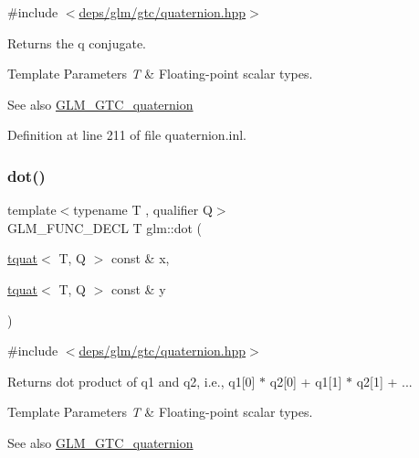 {\ttfamily \#include $<$\hyperlink{gtc_2quaternion_8hpp}{deps/glm/gtc/quaternion.\+hpp}$>$}

Returns the q conjugate.


\begin{DoxyTemplParams}{Template Parameters}
{\em T} & Floating-\/point scalar types.\\
\hline
\end{DoxyTemplParams}
\begin{DoxySeeAlso}{See also}
\hyperlink{group__gtc__quaternion}{G\+L\+M\+\_\+\+G\+T\+C\+\_\+quaternion} 
\end{DoxySeeAlso}


Definition at line 211 of file quaternion.\+inl.

\mbox{\label{group__gtc__quaternion_gab219911644fdc694e7d275cfcf35bfca}} 
\subsubsection{\texorpdfstring{dot()}{dot()}}
{\footnotesize\ttfamily template$<$typename T , qualifier Q$>$ \\
G\+L\+M\+\_\+\+F\+U\+N\+C\+\_\+\+D\+E\+CL T glm\+::dot (\begin{DoxyParamCaption}\item[{\hyperlink{structglm_1_1tquat}{tquat}$<$ T, Q $>$ const \&}]{x,  }\item[{\hyperlink{structglm_1_1tquat}{tquat}$<$ T, Q $>$ const \&}]{y }\end{DoxyParamCaption})}



{\ttfamily \#include $<$\hyperlink{gtc_2quaternion_8hpp}{deps/glm/gtc/quaternion.\+hpp}$>$}

Returns dot product of q1 and q2, i.\+e., q1\mbox{[}0\mbox{]} $\ast$ q2\mbox{[}0\mbox{]} + q1\mbox{[}1\mbox{]} $\ast$ q2\mbox{[}1\mbox{]} + ...


\begin{DoxyTemplParams}{Template Parameters}
{\em T} & Floating-\/point scalar types.\\
\hline
\end{DoxyTemplParams}
\begin{DoxySeeAlso}{See also}
\hyperlink{group__gtc__quaternion}{G\+L\+M\+\_\+\+G\+T\+C\+\_\+quaternion} 
\end{DoxySeeAlso}


